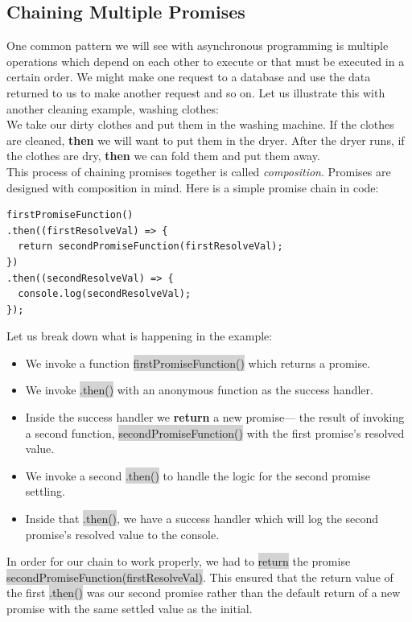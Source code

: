 \documentclass[11pt]{article}
\begin{document}
\subsection{Chaining Multiple Promises}
One common pattern we will see with asynchronous programming is multiple operations which depend on each other to execute or that must be executed in a certain order. We might make one request to a database and use the data returned to us to make another request and so on. Let us illustrate this with another cleaning example, washing clothes: \\
\newline
We take our dirty clothes and put them in the washing machine. If the clothes are cleaned, \textbf{then} we will want to put them in the dryer. After the dryer runs, if the clothes are dry, \textbf{then} we can fold them and put them away. \\
\newline
This process of chaining promises together is called \textit{composition}. Promises are designed with composition in mind. Here is a simple promise chain in code:
\begin{lstlisting}
firstPromiseFunction()
.then((firstResolveVal) => {
  return secondPromiseFunction(firstResolveVal);
})
.then((secondResolveVal) => {
  console.log(secondResolveVal);
});
\end{lstlisting}
Let us break down what is happening in the example:
\begin{itemize}[leftmargin = *]
\item We invoke a function \colorbox{lightgray}{firstPromiseFunction()} which returns a promise.
\item We invoke \colorbox{lightgray}{.then()} with an anonymous function as the success handler.
\item Inside the success handler we \textbf{return} a new promise— the result of invoking a second function, \colorbox{lightgray}{secondPromiseFunction()} with the first promise’s resolved value.
\item We invoke a second \colorbox{lightgray}{.then()} to handle the logic for the second promise settling.
\item Inside that \colorbox{lightgray}{.then()}, we have a success handler which will log the second promise’s resolved value to the console.
\end{itemize}
In order for our chain to work properly, we had to \colorbox{lightgray}{return} the promise \colorbox{lightgray}{secondPromiseFunction(firstResolveVal)}. This ensured that the return value of the first \colorbox{lightgray}{.then()} was our second promise rather than the default return of a new promise with the same settled value as the initial. \\
\end{document}
